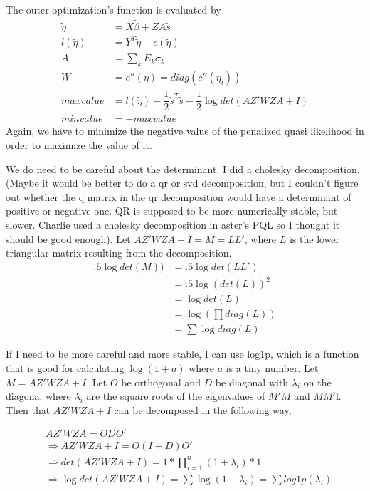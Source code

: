 \documentclass{article}
\begin{document}
The outer optimization's function is evaluated by
\begin{align}
\tilde{\eta} &= X \tilde{\beta} +ZA \tilde{s}\\
l(\tilde{\eta}) &= Y^T \tilde{\eta} - c(\tilde{\eta})\\
A&= \sum_k E_k \sigma_k\\
W&=c''(\eta)=diag(c''(\eta_i))\\
maxvalue&= l(\tilde{\eta}) - \dfrac{1}{2} \tilde{s}^T \tilde{s} - \dfrac{1}{2} \log det \left( AZ' W ZA +I  \right)\\
minvalue&= - maxvalue
\end{align}
Again, we have to minimize the negative value of the penalized quasi likelihood in order to maximize the value of it.

We do need to be careful about the determinant.  I did a cholesky decomposition.(Maybe it would be better to do a qr or svd decomposition, but I couldn't figure out whether the q matrix in the qr decomposition would have a determinant of positive or negative one. QR is supposed to be more numerically stable, but slower. Charlie used a cholesky decomposition in aster's PQL so I thought it should be good enough).  Let $AZ' W ZA +I=M=LL'$, where $L$ is the lower triangular matrix resulting from the decomposition.
\begin{align}
.5 \log det(M)) &=.5 \log det(LL')\\
&= .5 \log (det(L))^2 \\
&=  \log det(L) \\
&= \log \left( \prod diag(L) \right) \\
&= \sum \log diag(L)
\end{align}

If I need to be more careful and more stable, I can use log1p, which is a function that is good for calculating $\log (1+ a)$ where $a$ is a tiny number. Let $M=AZ' W ZA +I$. Let $O$ be orthogonal and $D$ be diagonal with $\lambda_i$ on the diagona, where $\lambda_i$ are the square roots of the eigenvalues of $M'M$ and $MM'$l. Then that  $AZ' W ZA +I$ can be decomposed in the following way, 

\begin{align*}
 &AZ' W ZA = ODO' \\
&\Rightarrow AZ' W ZA +I  = O (I+D) O' \\
&\Rightarrow  det \left( AZ' W ZA +I \right) = 1 *  \prod_{i=1}^n (1+\lambda_i) *1\\
&\Rightarrow \log  det \left( AZ' W ZA +I \right) = \sum \log(1+\lambda_i) = \sum log1p(\lambda_i)
\end{align*}
\end{document}
